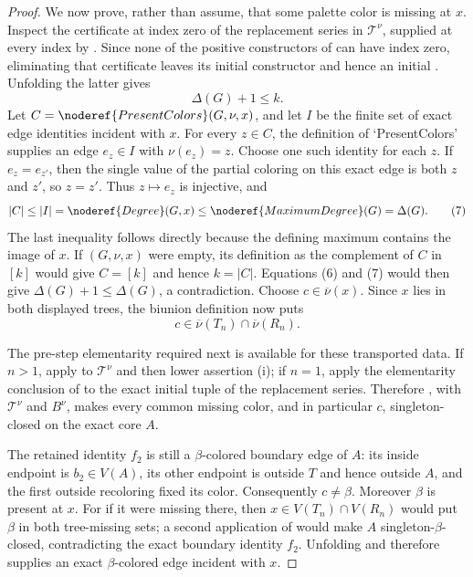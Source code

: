 \begin{proof}
We now prove, rather than assume, that some palette color is missing at
$x$.  Inspect the certificate at index zero of the replacement series in
$\mathcal T^\nu$, supplied at every index by .
Since none of the positive constructors of
 can have index zero, eliminating that
certificate leaves its initial constructor and hence an initial
.  Unfolding the latter gives
\[
                         \Delta(G)+1\leq k.                     \tag{6}
\]
Let $C=\noderef{PresentColors}(G,\nu,x)$, and let $I$ be the finite set
of exact edge identities incident with $x$.  For every $z\in C$, the
definition of `PresentColors' supplies an edge $e_z\in I$ with
$\nu(e_z)=z$.  Choose one such identity for each $z$.  If
$e_z=e_{z'}$, then the single value of the partial coloring on this exact
edge is both $z$ and $z'$, so $z=z'$.  Thus $z\mapsto e_z$ is injective,
and
\[
 |C|\leq |I|=\noderef{Degree}(G,x)\leq
 \noderef{MaximumDegree}(G)=\Delta(G).                          \tag{7}
\]
The last inequality follows directly because the defining maximum contains
the image of $x$.  If $(G,\nu,x)$ were empty,
its definition as the complement of $C$ in $[k]$ would give
$C=[k]$ and hence $k=|C|$.  Equations (6) and (7) would then give
$\Delta(G)+1\leq\Delta(G)$, a contradiction.  Choose
$c\in\overline\nu(x)$.  Since $x$ lies in both displayed trees, the
biunion definition  now puts
\[
                 c\in\overline\nu(T_n)\cap\overline\nu(R_n). \tag{8}
\]

The pre-step elementarity required next is available for these transported
data.  If $n>1$, apply  to
$\mathcal T^\nu$ and then lower assertion (i); if $n=1$, apply the
elementarity conclusion of  to the exact
initial tuple of the replacement series.  Therefore
, with $\mathcal T^\nu$ and
$B^\nu$, makes every common missing color, and in particular $c$,
singleton-closed on the exact core $A$.

The retained identity $f_2$ is still a $\beta$-colored boundary edge of
$A$: its inside endpoint is $b_2\in V(A)$, its other endpoint is outside
$T$ and hence outside $A$, and the first outside recoloring fixed its
color.  Consequently $c\ne\beta$.  Moreover $\beta$ is present at $x$.
For if it were missing there, then $x\in V(T_n)\cap V(R_n)$ would put
$\beta$ in both tree-missing sets; a second application of
 would make $A$ singleton-$\beta$-
closed, contradicting the exact boundary identity $f_2$.  Unfolding
 and  therefore supplies
an exact $\beta$-colored edge incident with $x$.


\end{proof}
